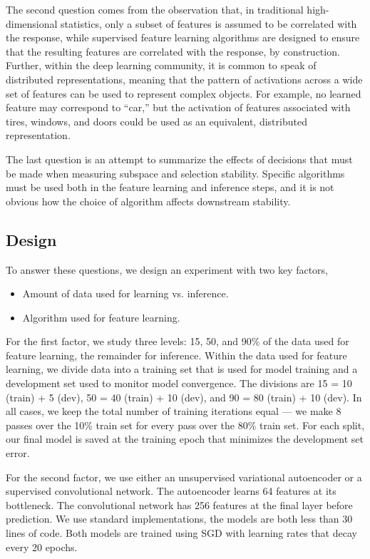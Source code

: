 The second question comes from the observation that, in traditional high-dimensional statistics, only a subset of features is assumed to be correlated with the response, while supervised feature learning algorithms are designed to ensure that the resulting features are correlated with the response, by construction. Further, within the deep learning community, it is common to speak of distributed representations, meaning that the pattern of activations across a wide set of features can be used to represent complex objects. For example, no learned feature may correspond to ``car,'' but the activation of features associated with tires, windows, and doors could be used as an equivalent, distributed representation.

The last question is an attempt to summarize the effects of decisions that must be made when measuring subspace and selection stability. Specific algorithms must be used both in the feature learning and inference steps, and it is not obvious how the choice of algorithm affects downstream stability.

\subsection{Design}

To answer these questions, we design an experiment with two key factors,

\begin{itemize}
\item Amount of data used for learning vs. inference.
\item Algorithm used for feature learning.
\end{itemize}

For the first factor, we study three levels: 15, 50, and 90\% of the data used for feature learning, the remainder for inference. Within the data used for feature learning, we divide data into a training set that is used for model training and a development set used to monitor model convergence. The divisions are 15 = 10 (train) + 5 (dev), 50 = 40 (train) + 10 (dev), and 90 = 80 (train) + 10 (dev). In all cases, we keep the total number of training iterations equal — we make 8 passes over the 10\% train set for every pass over the 80\% train set. For each split, our final model is saved at the training epoch that minimizes the development set error.

For the second factor, we use either an unsupervised variational autoencoder or a supervised convolutional network. The autoencoder learns 64 features at its bottleneck. The convolutional network has 256 features at the final layer before prediction. We use standard implementations, the models are both less than 30 lines of code. Both models are trained using SGD with learning rates that decay every 20 epochs.

